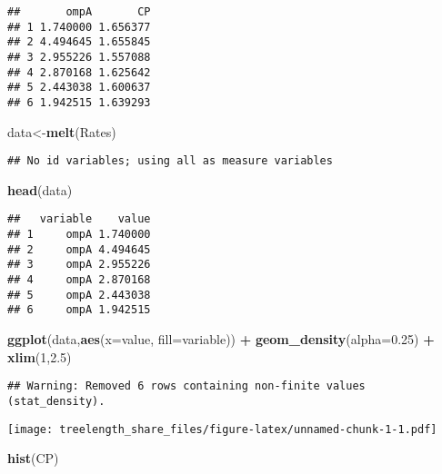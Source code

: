 \documentclass[]{article}
\newenvironment{Shaded}{\begin{snugshade}}{\end{snugshade}}
\newcommand{\DataTypeTok}[1]{\textcolor[rgb]{0.13,0.29,0.53}{#1}}
\newcommand{\DecValTok}[1]{\textcolor[rgb]{0.00,0.00,0.81}{#1}}
\newcommand{\FloatTok}[1]{\textcolor[rgb]{0.00,0.00,0.81}{#1}}
\newcommand{\KeywordTok}[1]{\textcolor[rgb]{0.13,0.29,0.53}{\textbf{#1}}}
\newcommand{\NormalTok}[1]{#1}
\newcommand{\OperatorTok}[1]{\textcolor[rgb]{0.81,0.36,0.00}{\textbf{#1}}}
\newcommand{\StringTok}[1]{\textcolor[rgb]{0.31,0.60,0.02}{#1}}
\begin{document}
\begin{verbatim}
##       ompA       CP
## 1 1.740000 1.656377
## 2 4.494645 1.655845
## 3 2.955226 1.557088
## 4 2.870168 1.625642
## 5 2.443038 1.600637
## 6 1.942515 1.639293
\end{verbatim}

\begin{Shaded}
\begin{Highlighting}[]
\NormalTok{data<-}\KeywordTok{melt}\NormalTok{(Rates)}
\end{Highlighting}
\end{Shaded}

\begin{verbatim}
## No id variables; using all as measure variables
\end{verbatim}

\begin{Shaded}
\begin{Highlighting}[]
\KeywordTok{head}\NormalTok{(data)}
\end{Highlighting}
\end{Shaded}

\begin{verbatim}
##   variable    value
## 1     ompA 1.740000
## 2     ompA 4.494645
## 3     ompA 2.955226
## 4     ompA 2.870168
## 5     ompA 2.443038
## 6     ompA 1.942515
\end{verbatim}

\begin{Shaded}
\begin{Highlighting}[]
\KeywordTok{ggplot}\NormalTok{(data,}\KeywordTok{aes}\NormalTok{(}\DataTypeTok{x=}\NormalTok{value, }\DataTypeTok{fill=}\NormalTok{variable)) }\OperatorTok{+}\StringTok{ }
\StringTok{  }\KeywordTok{geom_density}\NormalTok{(}\DataTypeTok{alpha=}\FloatTok{0.25}\NormalTok{) }\OperatorTok{+}
\StringTok{  }\KeywordTok{xlim}\NormalTok{(}\DecValTok{1}\NormalTok{,}\FloatTok{2.5}\NormalTok{)}
\end{Highlighting}
\end{Shaded}

\begin{verbatim}
## Warning: Removed 6 rows containing non-finite values (stat_density).
\end{verbatim}

\texttt{[image: treelength\_share\_files/figure-latex/unnamed-chunk-1-1.pdf]}

\begin{Shaded}
\begin{Highlighting}[]
\KeywordTok{hist}\NormalTok{(CP)}
\end{Highlighting}
\end{Shaded}
\end{document}
